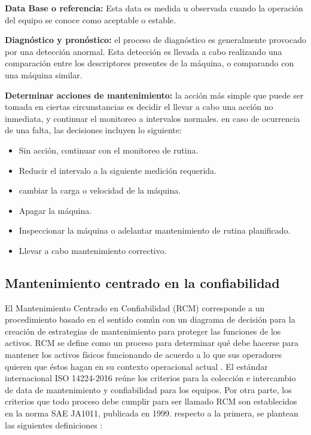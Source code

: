 \begin{description}
\item \textbf{Data Base o referencia:} Esta data es medida u observada cuando la operación del equipo se conoce como aceptable o estable. 

\item \textbf{Diagnóstico y pronóstico:} el proceso de diagnóstico es generalmente provocado por una detección anormal. Esta detección es llevada a cabo realizando una comparación entre los descriptores presentes de la máquina, o comparando con una máquina similar.

\item \textbf{Determinar acciones de mantenimiento:} la acción más simple que puede ser tomada en ciertas circunstancias es decidir el llevar a cabo una acción no inmediata,  y continuar el monitoreo a intervalos normales. en caso de ocurrencia de una falta, las decisiones incluyen lo siguiente:
\begin{itemize}
\item Sin acción, continuar con el monitoreo de rutina.
\item Reducir el intervalo a la siguiente medición requerida.
\item cambiar la carga o velocidad de la máquina.
\item Apagar la máquina.
\item Inspeccionar la máquina o adelantar mantenimiento de rutina planificado.
\item Llevar a cabo mantenimiento correctivo.

\end{itemize}
\end{description}




\subsection{Mantenimiento centrado en la confiabilidad}



El Mantenimiento Centrado en Confiabilidad (RCM) corresponde a un procedimiento basado en el sentido común con un diagrama de decisión para la creación de estrategias de mantenimiento para proteger las funciones de los activos. RCM se define como un proceso para determinar qué debe hacerse para mantener los activos físicos funcionando de acuerdo a lo que sus operadores quieren que éstos hagan en su contexto operacional actual \citep{sifonte2017}.
El estándar internacional ISO 14224-2016 reúne los criterios para la colección e intercambio de data de mantenimiento y confiabilidad para los equipos. Por otra parte, los criterios que todo proceso debe cumplir para ser llamado RCM son establecidos en la norma SAE JA1011, publicada en 1999. respecto a la primera, se plantean las siguientes definiciones \citep{iso2016}:\\


